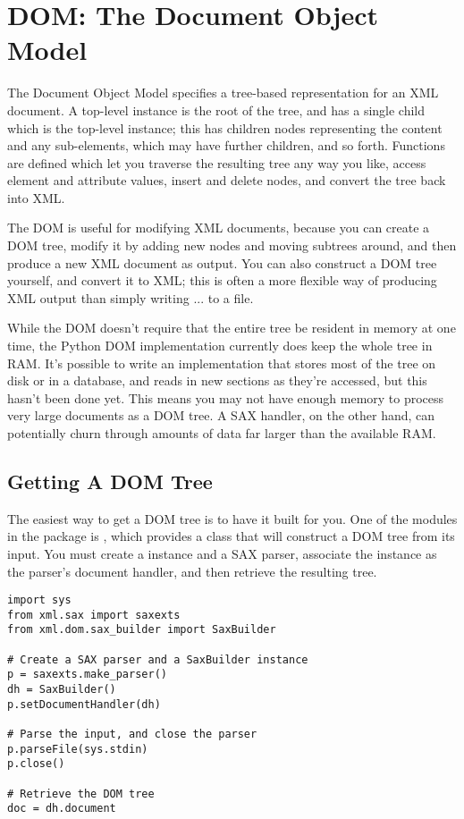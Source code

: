\documentclass{howto}
\begin{document}
\section{DOM: The Document Object Model}
\label{DOM}

The Document Object Model specifies a tree-based representation for an
XML document.  A top-level  instance is the root of
the tree, and has a single child which is the top-level
 instance; this  has children nodes
representing the content and any sub-elements, which may have further
children, and so forth.  Functions are defined which let you traverse
the resulting tree any way you like, access element and attribute
values, insert and delete nodes, and convert the tree back into XML.

The DOM is useful for modifying XML documents, because you can create
a DOM tree, modify it by adding new nodes and moving subtrees around,
and then produce a new XML document as output.  You can also construct
a DOM tree yourself, and convert it to XML; this is often a more
flexible way of producing XML output than simply writing
... to a file.

While the DOM doesn't require that the entire tree be resident in
memory at one time, the Python DOM implementation currently does keep
the whole tree in RAM.  It's possible to write an implementation that
stores most of the tree on disk or in a database, and reads in new
sections as they're accessed, but this hasn't been done yet.
This means you may not have enough memory to process very large
documents as a DOM tree.  A SAX handler, on the other hand, can
potentially churn through amounts of data far larger than the
available RAM.

\subsection{Getting A DOM Tree}

The easiest way to get a DOM tree is to have it built for you.  One of
the modules in the  package is
, which provides a  class
that will construct a DOM tree from its input.  You must create a
 instance and a SAX parser, associate the instance
as the parser's document handler, and then retrieve the resulting
tree.

\begin{verbatim}
import sys
from xml.sax import saxexts
from xml.dom.sax_builder import SaxBuilder

# Create a SAX parser and a SaxBuilder instance
p = saxexts.make_parser()
dh = SaxBuilder()
p.setDocumentHandler(dh)

# Parse the input, and close the parser
p.parseFile(sys.stdin)
p.close()

# Retrieve the DOM tree
doc = dh.document
\end{verbatim}
\end{document}
